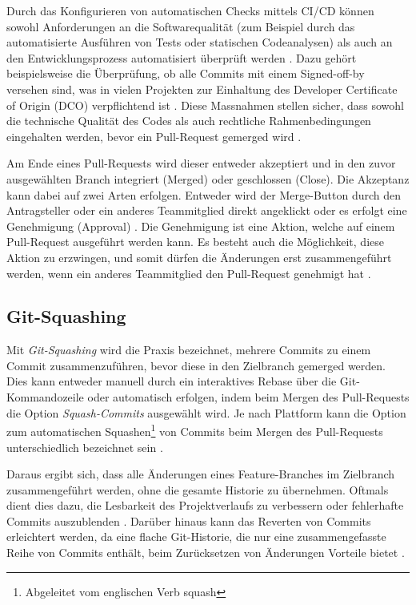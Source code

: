 Durch das Konfigurieren von automatischen Checks mittels CI/CD können sowohl Anforderungen an die Softwarequalität (zum Beispiel durch das automatisierte Ausführen von Tests oder statischen Codeanalysen) als auch an den Entwicklungsprozess automatisiert überprüft werden \parencite{kinsman_how_2021}. Dazu gehört beispielsweise die Überprüfung, ob alle Commits mit einem Signed-off-by versehen sind, was in vielen Projekten zur Einhaltung des Developer Certificate of Origin (DCO) verpflichtend ist \parencite{holtgrave_attributing_2025}. Diese Massnahmen stellen sicher, dass sowohl die technische Qualität des Codes als auch rechtliche Rahmenbedingungen eingehalten werden, bevor ein Pull-Request gemerged wird \parencite{noauthor_about_nodate}. 

Am Ende eines Pull-Requests wird dieser entweder akzeptiert und in den zuvor ausgewählten Branch integriert (Merged) oder geschlossen (Close)\parencite{noauthor_merging_nodate}\parencite{noauthor_closing_nodate}. Die Akzeptanz kann dabei auf zwei Arten erfolgen. Entweder wird der Merge-Button durch den Antragsteller oder ein anderes Teammitglied direkt angeklickt oder es erfolgt eine Genehmigung (Approval) \parencite{noauthor_merging_nodate}\parencite{noauthor_reviewing_nodate}. Die Genehmigung ist eine Aktion, welche auf einem Pull-Request ausgeführt werden kann. Es besteht auch die Möglichkeit, diese Aktion zu erzwingen, und somit dürfen die Änderungen erst zusammengeführt werden, wenn ein anderes Teammitglied den Pull-Request genehmigt hat \parencite{noauthor_approving_nodate}.

\subsection{Git-Squashing}
\label{sec:GitSquashing}
Mit \textit{Git-Squashing} wird die Praxis bezeichnet, mehrere Commits zu einem Commit zusammenzuführen, bevor diese in den Zielbranch gemerged werden. Dies kann entweder manuell durch ein interaktives Rebase über die Git-Kommandozeile oder automatisch erfolgen, indem beim Mergen des Pull-Requests die Option \textit{Squash-Commits} ausgewählt wird. \parencite{noauthor_git_nodate} Je nach Plattform kann die Option zum automatischen Squashen\footnote{Abgeleitet vom englischen Verb squash} von Commits beim Mergen des Pull-Requests unterschiedlich bezeichnet sein \parencite{noauthor_about_nodate} \parencite{noauthor_squash_nodate}.

Daraus ergibt sich, dass alle Änderungen eines Feature-Branches im Zielbranch zusammengeführt werden, ohne die gesamte Historie zu übernehmen. Oftmals dient dies dazu, die Lesbarkeit des Projektverlaufs zu verbessern oder fehlerhafte Commits auszublenden \parencite{codoban_comparative_2015}. Darüber hinaus kann das Reverten von Commits erleichtert werden, da eine flache Git-Historie, die nur eine zusammengefasste Reihe von Commits enthält, beim Zurücksetzen von Änderungen Vorteile bietet \parencite{just_switching_2016}.

